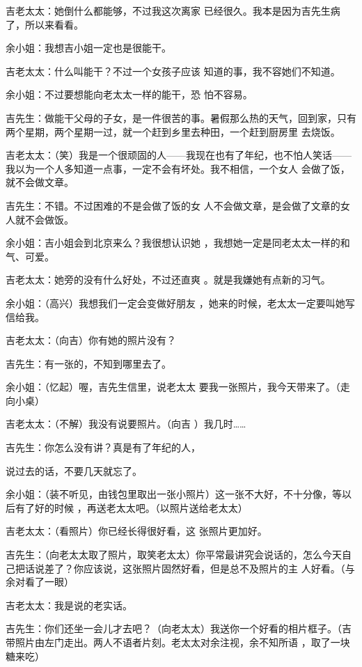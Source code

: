 \documentclass{article}
\begin{document}
吉老太太：她倒什么都能够，不过我这次离家
已经很久。我本是因为吉先生病了，所以来看看。 

\newpage


余小姐：我想吉小姐一定也是很能干。 

吉老太太：什么叫能干？不过一个女孩子应该
知道的事，我不容她们不知道。 

余小姐：不过要想能向老太太一样的能干，恐
怕不容易。 

吉先生：做能干父母的子女，是一件很苦的事。暑假那么热的天气，回到家，只有两个星期，两个星期一过，就一个赶到乡里去种田，一个赶到厨房里
去烧饭。 

吉老太太：（笑）我是一个很顽固的人——我现在也有了年纪，也不怕人笑话——我以为一个人多知道一点事，一定不会有坏处。我不相信，一个女人
会做了饭，就不会做文章。 

吉先生：不错。不过困难的不是会做了饭的女
人不会做文章，是会做了文章的女人就不会做饭。 

\newpage

余小姐：吉小姐会到北京来么？我很想认识她
，我想她一定是同老太太一样的和气、可爱。 

吉老太太：她旁的没有什么好处，不过还直爽
。就是我嫌她有点新的习气。 

余小姐：（高兴）我想我们一定会变做好朋友
，她来的时候，老太太一定要叫她写信给我。 


吉老太太：（向吉）你有她的照片没有？ 


吉先生：有一张的，不知到哪里去了。 

余小姐：（忆起）喔，吉先生信里，说老太太
要我一张照片，我今天带来了。（走向小桌） 

吉老太太：（不解）我没有说要照片。（向吉
）我几时…… 

吉先生：你怎么没有讲？真是有了年纪的人，

\newpage
说过去的话，不要几天就忘了。 

余小姐：（装不听见，由钱包里取出一张小照片）这一张不大好，不十分像，等以后有了好的时候
，再送老太太吧。（以照片送给老太太） 

吉老太太：（看照片）你已经长得很好看，这
张照片更加好。 

吉先生：（向老太太取了照片，取笑老太太）你平常最讲究会说话的，怎么今天自己把话说差了？你应该说，这张照片固然好看，但是总不及照片的主
人好看。（与余对看了一眼） 


吉老太太：我是说的老实话。 

吉先生：你们还坐一会儿才去吧？（向老太太）我送你一个好看的相片框子。（吉带照片由左门走出。两人不语者片刻。老太太对余注视，余不知所语
，取了一块糖来吃） 
\end{document}
